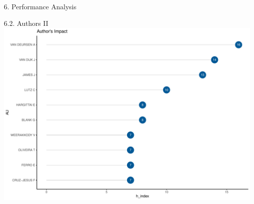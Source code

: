 \documentclass[
  ignorenonframetext,
]{beamer}
\begin{document}
\begin{frame}{6. Performance Analysis}
\protect\hypertarget{performance-analysis-1}{}
\begin{block}{6.2. Authors II}
\protect\hypertarget{authors-ii}{}
\includegraphics{Presentation_bibliometric_files/figure-beamer/H-index AU chart-1.pdf}
\end{block}
\end{frame}
\end{document}
